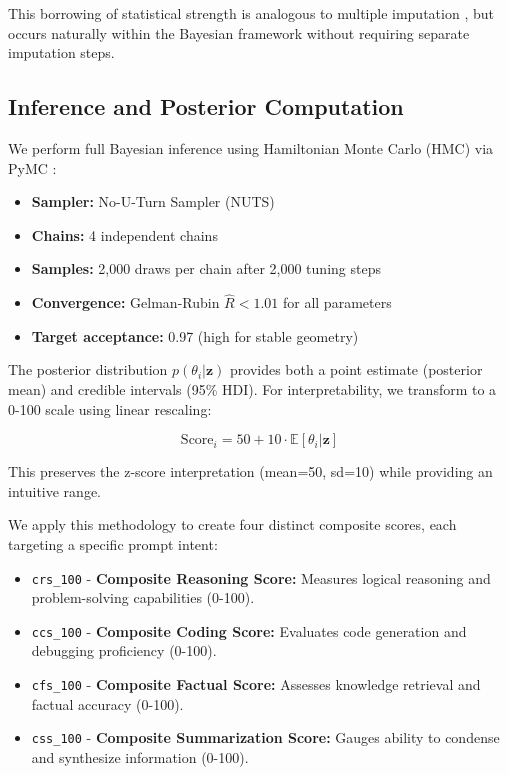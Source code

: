 This borrowing of statistical strength is analogous to multiple imputation \cite{rubin1987multiple}, but occurs naturally within the Bayesian framework without requiring separate imputation steps.

\subsection{Inference and Posterior Computation}

We perform full Bayesian inference using Hamiltonian Monte Carlo (HMC) via PyMC \cite{abril2023pymc}:

\begin{itemize}
    \item \textbf{Sampler:} No-U-Turn Sampler (NUTS) \cite{hoffman2014nuts}
    \item \textbf{Chains:} 4 independent chains
    \item \textbf{Samples:} 2,000 draws per chain after 2,000 tuning steps
    \item \textbf{Convergence:} Gelman-Rubin $\hat{R} < 1.01$ for all parameters
    \item \textbf{Target acceptance:} 0.97 (high for stable geometry)
\end{itemize}

The posterior distribution $p(\theta_i | \mathbf{z})$ provides both a point estimate (posterior mean) and credible intervals (95\% HDI). For interpretability, we transform to a 0-100 scale using linear rescaling:

\begin{equation}
\text{Score}_{i} = 50 + 10 \cdot \mathbb{E}[\theta_i | \mathbf{z}]
\end{equation}

This preserves the z-score interpretation (mean=50, sd=10) while providing an intuitive range.

We apply this methodology to create four distinct composite scores, each targeting a specific prompt intent:

\begin{itemize}
    \item \texttt{crs\_100} - \textbf{Composite Reasoning Score:} Measures logical reasoning and problem-solving capabilities (0-100).
    \item \texttt{ccs\_100} - \textbf{Composite Coding Score:} Evaluates code generation and debugging proficiency (0-100).
    \item \texttt{cfs\_100} - \textbf{Composite Factual Score:} Assesses knowledge retrieval and factual accuracy (0-100).
    \item \texttt{css\_100} - \textbf{Composite Summarization Score:} Gauges ability to condense and synthesize information (0-100).
\end{itemize}

